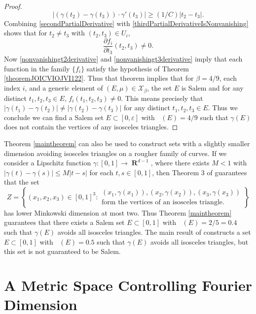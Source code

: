 \documentclass[dvipsnames,letterpaper,12pt]{article}
\numberwithin{equation}{section}
\DeclareMathOperator{\hausdim}{\dim_{\mathbf{H}}}
\DeclareMathOperator{\fordim}{\dim_{\mathbf{F}}}
\DeclareMathOperator{\RR}{\mathbf{R}}
\numberwithin{theorem}{section}
\begin{document}
\begin{proof}
\begin{equation}
        |(\gamma(t_2) - \gamma(t_3)) \cdot \gamma'(t_3)| \geq (1/C) |t_2 - t_3|.
    \end{equation}
    Combining \eqref{secondPartialDerivative} with \eqref{thirdPartialDerivativeIsNonvanishing} shows that for $t_2 \neq t_3$ with $(t_2,t_3) \in U_i$,
    \begin{equation} \label{nonvanishingt3derivative}
        \frac{\partial f_i}{\partial t_3}(t_2,t_3) \neq 0.
    \end{equation}
    Now \eqref{nonvanishingt2derivative} and \eqref{nonvanishingt3derivative} imply that each function in the family $\{ f_i \}$ satisfy the hypothesis of Theorem \ref{theoremJOICVIOJVI122}. Thus that theorem implies that for $\beta = 4/9$, each index $i$, and a generic element of $(E,\mu) \in \mathcal{X}_\beta$, the set $E$ is Salem and for any distinct $t_1,t_2,t_3 \in E$, $f_i(t_1,t_2,t_3) \neq 0$. This means precisely that $|\gamma(t_1) - \gamma(t_2)| \neq |\gamma(t_2) - \gamma(t_3)|$ for any distinct $t_1,t_2,t_3 \in E$. Thus we conclude we can find a Salem set $E \subset [0,\varepsilon]$ with $\fordim(E) = 4/9$ such that $\gamma(E)$ does not contain the vertices of any isosceles triangles.
\end{proof}

Theorem \ref{maintheorem} can also be used to construct sets with a slightly smaller dimension avoiding isosceles triangles on a rougher family of curves. If we consider a Lipschitz function $\gamma: [0,1] \to \RR^{d-1}$, where there exists $M < 1$ with $|\gamma(t) - \gamma(s)| \leq M |t - s|$ for each $t,s \in [0,1]$, then Theorem 3 of \cite{OurPaper} guarantees that the set
%
\[ Z = \left\{ (x_1,x_2,x_3) \in [0,1]^3 : \begin{array}{c}
            \text{$(x_1,\gamma(x_1)), (x_2,\gamma(x_2)), (x_3,\gamma(x_3))$}\\
            \text{form the vertices of an isosceles triangle.} \end{array} \right\} \]
%
has lower Minkowski dimension at most two. Thus Theorem \ref{maintheorem} guarantees that there exists a Salem set $E \subset [0,1]$ with $\fordim(E) = 2/5 = 0.4$ such that $\gamma(E)$ avoids all isosceles triangles. The main result of \cite{PramanikFraser} constructs a set $E \subset [0,1]$ with $\hausdim(E) = 0.5$ such that $\gamma(E)$ avoids all isosceles triangles, but this set is not guaranteed to be Salem.



\section{A Metric Space Controlling Fourier Dimension}
\end{document}
